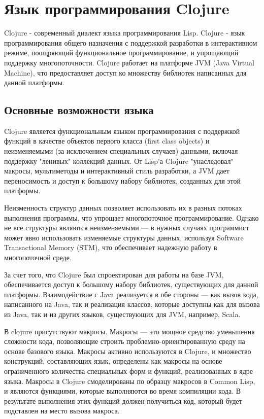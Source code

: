 \section{Язык программирования Clojure}

Clojure - современный диалект языка программирования Lisp. Clojure - язык программирования общего назначения с поддержкой разработки в интерактивном режиме, поощряющий функциональное программирование, и упрощающий поддержку многопоточности. Clojure работает на платформе JVM (Java Virtual Machine), что предоставляет доступ ко множеству библиотек написанных для данной платформы.

\subsection{Основные возможности языка}

Clojure является функциональным языком программирования с поддержкой функций в качестве объектов первого класса (first class objects) и неизменяемыми (за исключением специальных случаев) данными, включая поддержку "ленивых" коллекций данных. От Lisp'а Clojure "унаследовал" макросы, мультиметоды и интерактивный стиль разработки, а JVM дает переносимость и доступ к большому набору библиотек, созданных для этой платформы.

Неизменность структур данных позволяет использовать их в разных потоках выполнения программы, что упрощает многопоточное программирование. Однако не все структуры являются неизменяемыми — в нужных случаях программист может явно использовать изменяемые структуры данных, используя Software Transactional Memory (STM), что обеспечивает надежную работу в многопоточной среде.

За счет того, что Clojure был спроектирован для работы на базе JVM, обеспечивается доступ к большому набору библиотек, существующих для данной платформы. Взаимодействие с Java реализуется в обе стороны — как вызов кода, написанного на Java, так и реализация классов, которые доступны как для вызова из Java, так и из других языков, существующих для JVM, например, Scala.

В clojure присутствуют макросы. Макросы — это мощное средство уменьшения сложности кода, позволяющие строить проблемно-ориентированную среду на основе базового языка. Макросы активно используются в Clojure, и множество конструкций, составляющих язык, определены как макросы на основе ограниченного количества специальных форм и функций, реализованных в ядре языка. Макросы в Clojure смоделированы по образцу макросов в Common Lisp, и являются функциями, которые выполняются во время компиляции кода. В результате выполнения этих функций должен получиться код, который будет подставлен на место вызова макроса.

